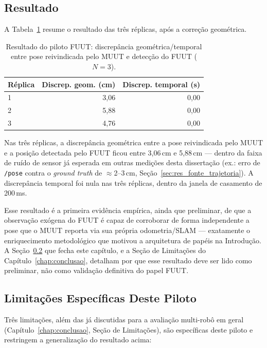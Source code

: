 \subsection{Resultado}

A Tabela~\ref{tab:fuut_piloto} resume o resultado das três réplicas, após
a correção geométrica.

\begin{table}[H]
\centering
\caption{Resultado do piloto FUUT: discrepância geométrica/temporal entre pose reivindicada pelo MUUT e detecção do FUUT ($N=3$).}
\label{tab:fuut_piloto}
\begin{tabular}{lrr}
\toprule
\textbf{Réplica} & \textbf{Discrep. geom. (cm)} & \textbf{Discrep. temporal (s)} \\
\midrule
1 & 3,06 & 0,00 \\
2 & 5,88 & 0,00 \\
3 & 4,76 & 0,00 \\
\bottomrule
\end{tabular}
\end{table}

Nas três réplicas, a discrepância geométrica entre a pose reivindicada
pelo MUUT e a posição detectada pelo FUUT ficou entre 3,06\,cm e 5,88\,cm
--- dentro da faixa de ruído de sensor já esperada em outras medições
desta dissertação (ex.: erro de \texttt{/\allowbreak pose} contra o
\textit{ground truth} de $\approx$2--3\,cm, Seção~\ref{sec:res_fonte_trajetoria}).
A discrepância temporal foi nula nas três réplicas, dentro da janela de
casamento de 200\,ms.

Esse resultado é a primeira evidência empírica, ainda que preliminar, de
que a observação exógena do FUUT é capaz de corroborar de forma
independente a pose que o MUUT reporta via sua própria odometria/SLAM ---
exatamente o enriquecimento metodológico que motivou a arquitetura de
papéis na Introdução. A Seção~\ref{sec:res_fuut_limitacoes} que fecha este
capítulo, e a Seção de Limitações do Capítulo~\ref{chap:conclusao},
detalham por que esse resultado deve ser lido como preliminar, não como
validação definitiva do papel FUUT.

\subsection{Limitações Específicas Deste Piloto}
\label{sec:res_fuut_limitacoes}

Três limitações, além das já discutidas para a avaliação multi-robô em
geral (Capítulo~\ref{chap:conclusao}, Seção de Limitações), são
específicas deste piloto e restringem a generalização do resultado
acima:

